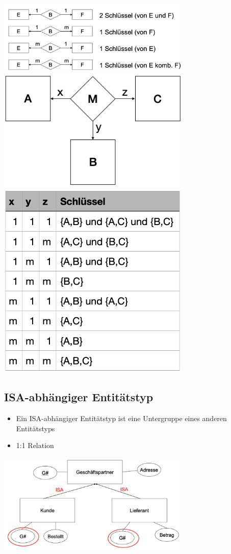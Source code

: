 \documentclass[8pt,a4paper]{scrartcl}
\begin{document}
\begin{multicols*}{3}
				\includegraphics[height=3.5cm]{img/beziehungkey.png}\\
				\includegraphics[height=5.9cm]{img/3kardi1.png}\\
				\includegraphics[height=9.5cm]{img/3kardi2.png}
		
	
			\subsection{ISA-abhängiger Entitätstyp}
				\begin{itemize}\itemsep0pt			
					\item Ein ISA-abhängiger Entitätstyp ist eine Untergruppe eines anderen Entitätstyps
					\item 1:1 Relation
				\end{itemize}
				\includegraphics[height=4.8cm]{img/ISA.png}
				

\end{multicols*}
\end{document}
